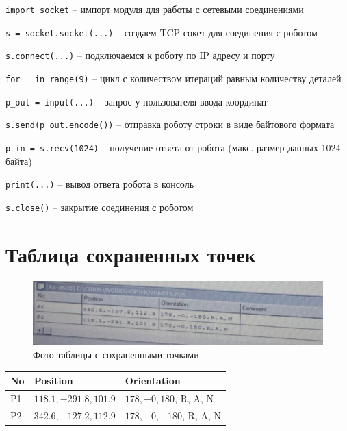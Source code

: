 \documentclass[a4paper, 12pt]{article}
\begin{document}
    \begin{compactitem}
        \item \texttt{import socket} -- импорт модуля для работы с сетевыми соединениями
        \item \texttt{s = socket.socket(...)} -- создаем TCP-сокет для соединения с роботом
        \item \texttt{s.connect(...)} -- подключаемся к роботу по IP адресу и порту
        \item \texttt{for \_ in range(9)} -- цикл с количеством итераций равным количеству деталей
        \item \texttt{p\_out = input(...)} -- запрос у пользователя ввода координат
        \item \texttt{s.send(p\_out.encode())} -- отправка роботу строки в виде байтового формата
        \item \texttt{p\_in = s.recv(1024)} -- получение ответа от робота (макс. размер данных 1024 байта)
        \item \texttt{print(...)} -- вывод ответа робота в консоль
        \item \texttt{s.close()} -- закрытие соединения с роботом
    \end{compactitem}


    \section{Таблица сохраненных точек}
    \begin{figure}[H]
        \centering
        \includegraphics[scale=1.35]{table.png}
        \captionsetup{skip=0pt}
        \caption{Фото таблицы с сохраненными точками}
        \label{fig:table}
    \end{figure}
    \begin{tabularx}{0.92\textwidth} { 
        | >{\raggedright\arraybackslash}X 
        | >{\raggedright\arraybackslash}X 
        | >{\raggedright\arraybackslash}X | }
       \hline
       No & Position & Orientation \\
       \hline
       P1 & $118.1, -291.8, 101.9$ & $178, -0, 180$, R, A, N \\
       \hline
       P2 & $342.6, -127.2, 112.9$ & $178, -0, -180$, R, A, N \\
      \hline
    \end{tabularx}
\end{document}
